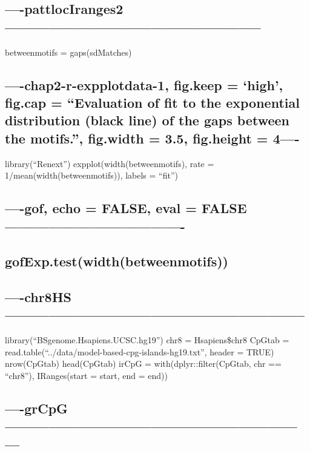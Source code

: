 \documentclass[]{article}
\begin{document}
\subsection{----pattlocIranges2-----------------------------------------------------}\label{pattlociranges2}

betweenmotifs = gaps(sdMatches)

\subsection{\texorpdfstring{----chap2-r-expplotdata-1, fig.keep =
`high', fig.cap = ``Evaluation of fit to the exponential distribution
(black line) of the gaps between the motifs.'', fig.width = 3.5,
fig.height =
4----}{----chap2-r-expplotdata-1, fig.keep = high, fig.cap = Evaluation of fit to the exponential distribution (black line) of the gaps between the motifs., fig.width = 3.5, fig.height = 4----}}\label{chap2-r-expplotdata-1-fig.keep-high-fig.cap-evaluation-of-fit-to-the-exponential-distribution-black-line-of-the-gaps-between-the-motifs.-fig.width-3.5-fig.height-4-}

library(``Renext'') expplot(width(betweenmotifs), rate =
1/mean(width(betweenmotifs)), labels = ``fit'')

\subsection{----gof, echo = FALSE, eval =
FALSE-------------------------------------}\label{gof-echo-false-eval-false-}

\subsection{gofExp.test(width(betweenmotifs))}\label{gofexp.testwidthbetweenmotifs}

\subsection{----chr8HS--------------------------------------------------------------}\label{chr8hs}

library(``BSgenome.Hsapiens.UCSC.hg19'') chr8 = Hsapiens\$chr8 CpGtab =
read.table(``../data/model-based-cpg-islands-hg19.txt'', header = TRUE)
nrow(CpGtab) head(CpGtab) irCpG = with(dplyr::filter(CpGtab, chr ==
``chr8''), IRanges(start = start, end = end))

\subsection{----grCpG---------------------------------------------------------------}\label{grcpg}
\end{document}
